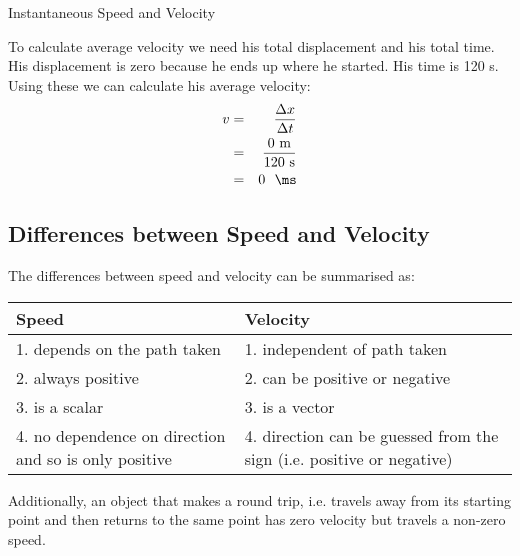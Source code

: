 \begin{wex}{Instantaneous Speed and Velocity}
{

To calculate average velocity we need his total displacement and his total
time. His displacement is zero because he ends up where he started. His
time is 120 s.
Using these we can calculate his average velocity:
\begin{eqnarray*}
v&=&\frac{\Delta x}{\Delta t} \\
&=& \frac{0~\rm m}{120~\rm s} \\
&=& 0 ~\rm \textrm{ \ms}
\end{eqnarray*}
}
\end{wex} 

\subsection{Differences between Speed and Velocity}
The differences between speed and velocity can be summarised as:

\begin{center}
\begin{tabular}{|p{5cm}|p{5cm}|}\hline
\textbf{Speed} & \textbf{Velocity} \\\hline
1. depends on the path taken & 1. independent of path taken \\\hline
2. always positive & 2. can be positive or negative \\\hline
3. is a scalar & 3. is a vector \\\hline
4. no dependence on direction and so is only positive & 4. direction can be guessed from the sign (i.e. positive or negative) \\\hline
\end{tabular}
\end{center}

Additionally, an object that makes a round trip, i.e. travels away from its starting point and then returns to the same point has zero velocity but travels a non-zero speed.

